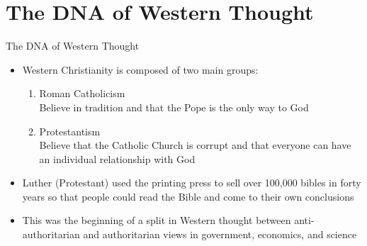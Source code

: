 \section{The DNA of Western Thought}
\begin{frame}{The DNA of Western Thought}{}
	\begin{itemize}
		\item Western Christianity is composed of two main groups:
		\begin{enumerate}
			\item Roman Catholicism\\
				Believe in tradition and that the Pope is the only way to God
			\item Protestantism\\
				Believe that the Catholic Church is corrupt and that everyone can have an individual relationship with God
		\end{enumerate}
		\item Luther (Protestant) used the printing press to sell over 100,000 bibles in forty years so that people could read the Bible and come to their own conclusions
		\item This was the beginning of a split in Western thought between anti-authoritarian and authoritarian views in government, economics, and science
	\end{itemize}
\end{frame}
